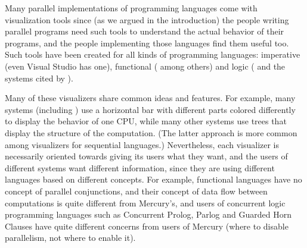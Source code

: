 % 
% 
% 
% 


Many parallel implementations of programming languages
come with visualization tools
since (as we argued in the introduction)
the people writing parallel programs
need such tools to understand the actual behavior of their programs,
and the people implementing those languages find them useful too.
Such tools have been created for all kinds of programming languages:
imperative (even Visual Studio has one),
functional
(\cite{edentraceviewer,loidl98:gransim,runciman93:profilingparfp} among others)
and logic (\cite{Foster96,vace}
and the systems cited by \cite{Gupta95parallelexecution}).

Many of these visualizers share common ideas and features.
For example, many systems (including \tscope)
use a horizontal bar with different parts colored differently
to display the behavior of one CPU,
while many other systems use trees
that display the structure of the computation.
(The latter approach is more common
among visualizers for sequential languages.)
Nevertheless, each visualizer is necessarily oriented
towards giving its users what they want,
and the users of different systems want different information,
since they are using different languages based on different concepts.
For example, functional languages have no concept of parallel conjunctions,
and their concept of data flow between computations
is quite different from Mercury's,
and users of concurrent logic programming languages
such as Concurrent Prolog, Parlog and Guarded Horn Clauses
have quite different concerns from users of Mercury
(where to disable parallelism, not where to enable it).

